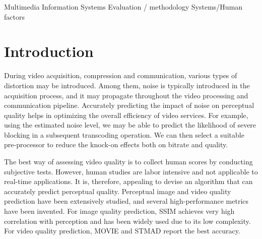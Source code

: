 \documentclass{sig-alternate}
\begin{document}
{Multimedia Information Systems Evaluation / methodology}
 {Systems/Human factors}


\section{Introduction}
During video acquisition, compression and communication, various types of distortion may be introduced. Among them, noise is typically introduced in the acquisition process, and it may propagate throughout the video processing and communication pipeline. Accurately predicting the impact of noise on perceptual quality helps in optimizing the overall efficiency of video services. For example, using the estimated noise level, we may be able to predict the likelihood of severe blocking in a subsequent transcoding operation\cite{AlMer1999}. We can then select a suitable pre-processor to reduce the knock-on effects both on bitrate and quality.

The best way of assessing video quality is to collect human scores by conducting subjective tests. However, human studies are labor intensive and not applicable to real-time applications. It is, therefore, appealing to devise an algorithm that can accurately predict perceptual quality. Perceptual image and video quality prediction have been extensively studied, and several high-performance metrics have been invented. For image quality prediction, SSIM\cite{SSIM} achieves very high correlation with perception and has been widely used due to its low complexity. For video quality prediction, MOVIE\cite{MOVIE} and STMAD\cite{STMAD} report the best accuracy. 
\end{document}
